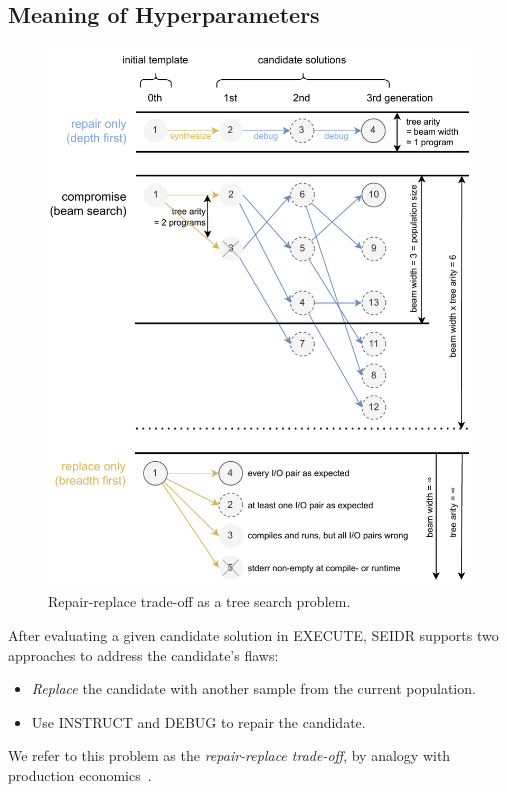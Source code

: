 \newpage\subsection{Meaning of Hyperparameters}
\label{sec:seidr-beam-search}

\begin{figure}[p]
    \centering
    \includegraphics[width=\linewidth, trim={0mm 4mm 0mm 0mm}]{images/beamsearch.pdf}
    \caption{Repair-replace trade-off as a tree search problem.}
    \label{fig:beam-search}
\end{figure}

After evaluating a given candidate solution in EXECUTE, SEIDR supports two approaches to address the candidate's flaws:
\begin{itemize}
\setlength{\parskip}{0pt}
\setlength\itemsep{0pt}
  \item \emph{Replace} the candidate with another sample from the current population.
  \item Use INSTRUCT and DEBUG to repair the candidate.
\end{itemize}
We refer to this problem as the \emph{repair-replace trade-off}, by analogy with production economics~\cite{jack2000:optimal}. 

